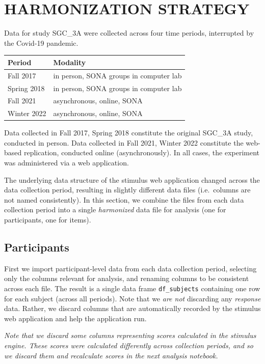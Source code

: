 \documentclass[
  letterpaper,
  DIV=11,
  numbers=noendperiod]{scrreprt}
\begin{document}
\hypertarget{harmonization-strategy}{%
\section{HARMONIZATION STRATEGY}\label{harmonization-strategy}}

Data for study SGC\_3A were collected across four time periods,
interrupted by the Covid-19 pandemic.

\begin{longtable}[]{@{}ll@{}}
\toprule()
Period & Modality \\
\midrule()
\endhead
Fall 2017 & in person, SONA groups in computer lab \\
Spring 2018 & in person, SONA groups in computer lab \\
Fall 2021 & asynchronous, online, SONA \\
Winter 2022 & asynchronous, online, SONA \\
\bottomrule()
\end{longtable}

Data collected in Fall 2017, Spring 2018 constitute the original SGC\_3A
study, conducted in person. Data collected in Fall 2021, Winter 2022
constitute the web-based replication, conducted online (asynchronously).
In all cases, the experiment was administered via a web application.

The underlying data structure of the stimulus web application changed
across the data collection period, resulting in slightly different data
files (i.e.~columns are not named consistently). In this section, we
combine the files from each data collection period into a single
\emph{harmonized} data file for analysis (one for participants, one for
items).

\hypertarget{participants}{%
\subsection{Participants}\label{participants}}

First we import participant-level data from each data collection period,
selecting only the columns relevant for analysis, and renaming columns
to be consistent across each file. The result is a single data frame
\texttt{df\_subjects} containing one row for each subject (across all
periods). Note that we \emph{are not} discarding any \emph{response}
data. Rather, we discard columns that are automatically recorded by the
stimulus web application and help the application run.

\emph{Note that we discard some columns representing scores calculated
in the stimulus engine. These scores were calculated differently across
collection periods, and so we discard them and recalculate scores in the
next analysis notebook.}
\end{document}
